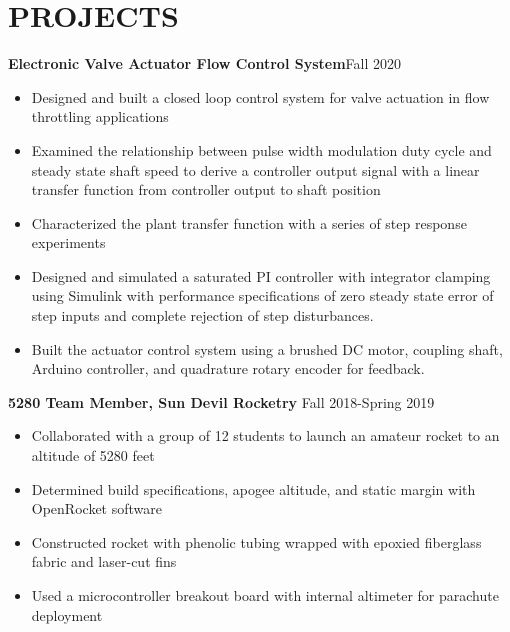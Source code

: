 \documentclass{article}
\begin{document}
\section{PROJECTS}
\textbf{Electronic Valve Actuator Flow Control System}\hfill Fall 2020
\vspace{0.5em}
\begin{itemize}
	\item Designed and built a closed loop control system for valve actuation in flow throttling applications
	\item Examined the relationship between pulse width modulation duty cycle and steady state shaft speed to derive a controller output signal with a linear transfer function from controller output to shaft position  
	\item Characterized the plant transfer function with a series of step response experiments
	\item  Designed and simulated a saturated PI controller with integrator clamping using Simulink with performance specifications of zero steady state error of step inputs and complete rejection of step disturbances.
	\item  Built the actuator control system using a brushed DC motor, coupling shaft, Arduino controller, and quadrature rotary encoder for feedback.
\end{itemize}
\vspace{0.5em}
\textbf{5280 Team Member, Sun Devil Rocketry}
\hfill Fall 2018-Spring 2019
\vspace{0.5em}
\begin{itemize}
	\item Collaborated with a group of 12 students to launch an amateur rocket to an altitude of 5280 feet
	\item Determined build specifications, apogee altitude, and static margin with OpenRocket software
	\item Constructed rocket with phenolic tubing wrapped with epoxied fiberglass fabric and laser-cut fins 
	\item Used a microcontroller breakout board with internal altimeter for parachute deployment
\end{itemize}

\thispagestyle{empty}
\end{document}
